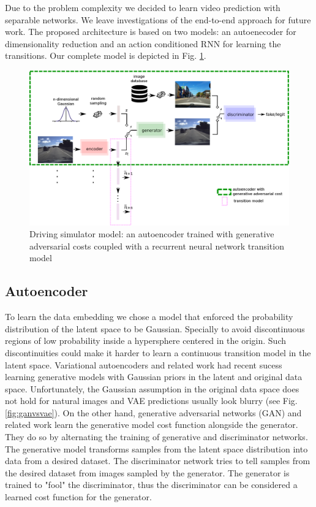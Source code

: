 \documentclass{article} %
\begin{document}
Due to the problem complexity we decided to learn video prediction with separable networks. We leave investigations of the end-to-end
approach for future work. The proposed architecture is based on two models:
an autoenecoder for dimensionality reduction and an action conditioned RNN for learning the transitions. Our complete model is depicted in
Fig. \ref{fig:aemodel}.

\begin{figure}[t]
 \centering
 \includegraphics[scale=0.37]{fullmodel.eps}
 \caption{Driving simulator model: an autoencoder trained with generative adversarial costs coupled with a recurrent neural network transition model}
  \label{fig:aemodel}

\end{figure}


\subsection{Autoencoder}
\label{sub:ae}
To learn the data embedding we chose a model that enforced the probability distribution of the latent space to be Gaussian. Specially to avoid
discontinuous regions of low probability inside a hypersphere centered in the origin. Such discontinuities could make it harder to
learn a continuous transition model in the latent space. Variational autoencoders \cite{VAE} and related work \cite{itlae} \cite{aae} had
recent sucess learning generative models with Gaussian priors in the latent and original data space. Unfortunately, the Gaussian assumption in the original
data space does not hold for natural images and VAE predictions usually look blurry (see Fig. \ref{fig:ganvsvae}).
On the other hand, generative adversarial networks (GAN) \cite{gan} and related work \cite{lapgan} \cite{dcgan} learn the generative model
cost function alongside the generator. They do so by alternating the training of generative and discriminator networks.
The generative model transforms samples from the latent space distribution into data from a desired dataset. The discriminator network
tries to tell samples from the desired dataset from images sampled by the generator. The generator is trained to "fool" the discriminator,
thus the discriminator can be considered a learned cost function for the generator.
\end{document}

